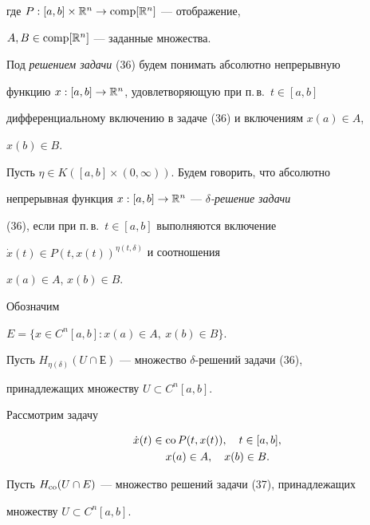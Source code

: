 где $P:[a,b]\times\Bbb R^n\to\operatorname{comp}[\Bbb R^n]$ --- отображение,


$A,B\in\operatorname{comp}[\Bbb R^n]$ --- заданные множества.





Под {\it решением задачи} (36) будем понимать абсолютно непрерывную


функцию $x:[a,b]\to\Bbb R^n$, удовлетворяющую при п.\,в.~$t\in[a,b]$


дифференциальному включению в задаче (36) и включениям $x(a)\in A$,


$x(b)\in B$.


Пусть $\eta\in K([a,b]\times(0,\infty))$. Будем говорить, что абсолютно


непрерывная функция $x:[a,b]\to\Bbb R^n$ --- {\it $\delta$-решение задачи}


(36), если при п.\,в.~$t\in[a,b]$ выполняются включение


$\Dot x(t)\in P(t,x(t))^{\eta(t,\delta)}$ и соотношения


$x(a)\in A$, $x(b)\in B$.





Обозначим


$E=\{x\in C^n[a,b]:x(a)\in A,\ x(b)\in B\}$.


Пусть $H_{\eta(\delta)}(U\cap Е)$ --- множество $\delta$-решений задачи (36),


принадлежащих множеству $U\subset C^n[a,b]$.





Рассмотрим задачу


\begin{equation}


\begin{split}


\Dot x(t)\in\co P&(t,x(t)),\quad t\in[a,b],\\


x(a)&\in A,\quad x(b)\in B.


\end{split}


\end{equation}





Пусть $H_{\operatorname{co}}(U\cap E)$ --- множество решений задачи (37), принадлежащих


множеству $U\subset C^n[a,b]$.





